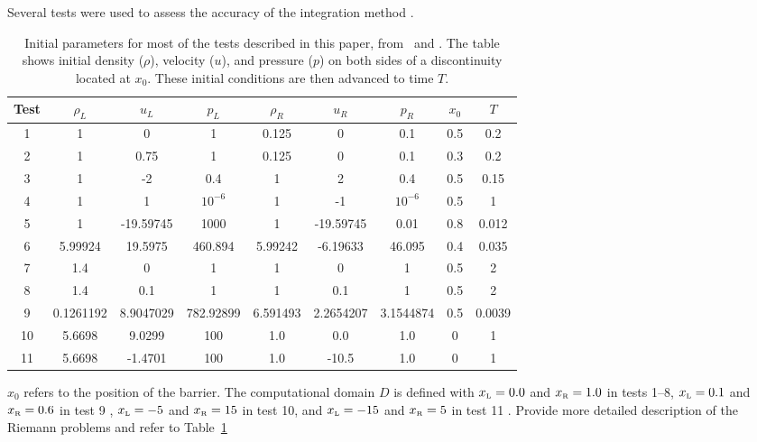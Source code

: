 \documentclass[10pt]{article}
\newcommand{\ee}[1]{{\color{blue} #1}}
\begin{document}

Several tests were used to assess the accuracy of the integration method \citep{LiskaWendroff2003}. 
\begin{table}[h!]
\begin{center}
\begin{tabular}{ |c|c c c|c c c|c c| }
 \hline
 Test & $\rho_L$ & $u_L$ & $p_L$ & $\rho_R$ & $u_R$ & $p_R$ & $x_0$ & $T$ \\
 \hline
 1 & 1 & 0 & 1 & 0.125 & 0 & 0.1 & 0.5 & 0.2 \\
 2 & 1 & 0.75 & 1 & 0.125 & 0 & 0.1 & 0.3 & 0.2 \\
 3 & 1 & -2 & 0.4 & 1 & 2 & 0.4 & 0.5 & 0.15 \\
 4 & 1 & 1 & $10^{-6}$ & 1 & -1 & $10^{-6}$ & 0.5 & 1 \\
 5 & 1 & -19.59745 & 1000 & 1 & -19.59745 & 0.01 & 0.8 & 0.012 \\
 6 & 5.99924 & 19.5975 & 460.894 & 5.99242 & -6.19633 & 46.095 & 0.4 & 0.035 \\
 7 & 1.4 & 0 & 1 & 1 & 0 & 1 & 0.5 & 2 \\
 8 & 1.4 & 0.1 & 1 & 1 & 0.1 & 1 & 0.5 & 2 \\
 9 & 0.1261192 & 8.9047029 & 782.92899 & 6.591493 & 2.2654207 & 3.1544874 & 0.5 & 0.0039 \\
10 & 5.6698 & 9.0299 & 100 & 1.0 & 0.0 & 1.0 & 0 & 1 \\
11 & 5.6698 & -1.4701 & 100 & 1.0 & -10.5 & 1.0 & 0 & 1 \\
 \hline
\end{tabular}
  \caption{Initial parameters for most of the tests described in this paper, from \citep{LiskaWendroff2003}~and \citep{Leveque2002}. The table shows initial density ($\rho$), velocity ($u$), and pressure ($p$) on both sides of a discontinuity located at $x_0$. These initial conditions are then advanced to time $T$.}
  \label{tab:testtable}
\end{center}
\end{table}
$x_0$ refers to the position of the barrier. 
The computational domain $D$ is defined with $x_{\mbox{\tiny L}}=0.0$ and $x_{\mbox{\tiny R}}=1.0$ in tests 1--8, $x_{\mbox{\tiny L}}=0.1$ and $x_{\mbox{\tiny R}}=0.6$ in test 9 \citep{LiskaWendroff2003}, $x_{\mbox{\tiny L}}=-5$ and $x_{\mbox{\tiny R}}=15$ in test 10, and $x_{\mbox{\tiny L}}=-15$ and $x_{\mbox{\tiny R}}=5$ in test 11 \citep{Leveque2002}. 
\ee{Provide more detailed description of the Riemann problems and refer to Table~\ref{tab:testtable}}
\end{document}
